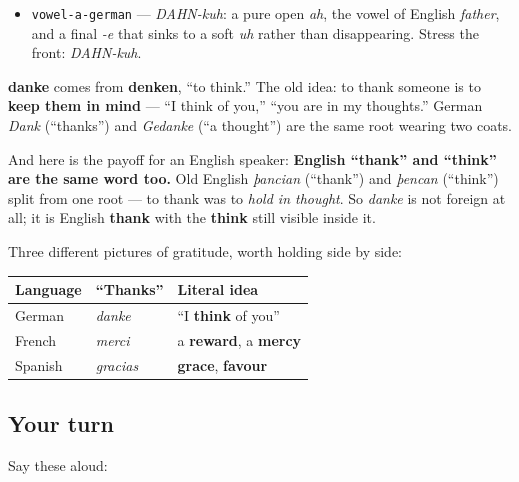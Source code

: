 \begin{sounds}
\begin{itemize}
\raggedright
  \item \texttt{vowel-a-german} — \emph{DAHN-kuh}: a pure open \emph{ah}, the vowel of English \emph{father}, and a final \emph{-e} that sinks to a soft \emph{uh} rather than disappearing. Stress the front: \emph{DAHN-kuh}.
\end{itemize}
\end{sounds}

\begin{cousinweb}
\textbf{danke} comes from \textbf{denken}, \textquotedblleft{}to think.\textquotedblright{} The old idea: to thank someone is to \textbf{keep them in mind} — \textquotedblleft{}I think of you,\textquotedblright{} \textquotedblleft{}you are in my thoughts.\textquotedblright{} German \emph{Dank} (\textquotedblleft{}thanks\textquotedblright{}) and \emph{Gedanke} (\textquotedblleft{}a thought\textquotedblright{}) are the same root wearing two coats.

And here is the payoff for an English speaker: \textbf{English \textquotedblleft{}thank\textquotedblright{} and \textquotedblleft{}think\textquotedblright{} are the same word too.} Old English \emph{þancian} (\textquotedblleft{}thank\textquotedblright{}) and \emph{þencan} (\textquotedblleft{}think\textquotedblright{}) split from one root — to thank was to \emph{hold in thought}. So \emph{danke} is not foreign at all; it is English \textbf{thank} with the \textbf{think} still visible inside it.

Three different pictures of gratitude, worth holding side by side:

\noindent
\begin{tabularx}{\linewidth}{@{}>{\raggedright\arraybackslash}X>{\raggedright\arraybackslash}X>{\raggedright\arraybackslash}X@{}}
\toprule
\textbf{Language} & \textbf{\textquotedblleft{}Thanks\textquotedblright{}} & \textbf{Literal idea} \\
\midrule
German & \emph{danke} & \textquotedblleft{}I \textbf{think} of you\textquotedblright{} \\
French & \emph{merci} & a \textbf{reward}, a \textbf{mercy} \\
Spanish & \emph{gracias} & \textbf{grace}, \textbf{favour} \\
\bottomrule
\end{tabularx}
\end{cousinweb}

\subsection*{Your turn}
Say these aloud:

